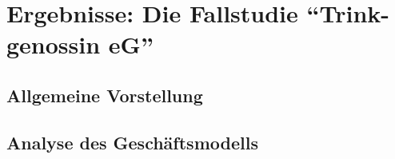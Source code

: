 \section{Ergebnisse: Die Fallstudie \enquote{Trink-genossin eG}}

\subsection{Allgemeine Vorstellung}

\subsection{Analyse des Geschäftsmodells}
